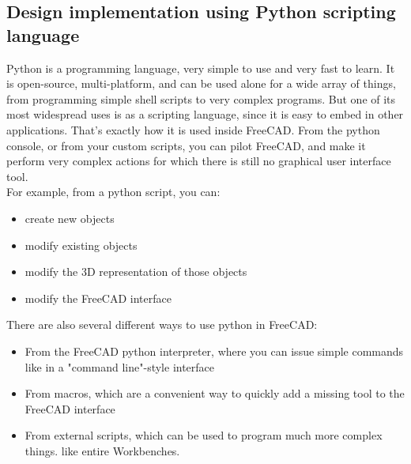 \subsection{Design implementation using Python scripting language}
Python is a programming language, very simple to use and very fast to learn. 
It is open-source, multi-platform, and can be used alone for a wide array of 
things, from programming simple shell scripts to very complex programs. But 
one of its most widespread uses is as a scripting language, since it is easy 
to embed in other applications. That's exactly how it is used inside FreeCAD. 
From the python console, or from your custom scripts, you can pilot FreeCAD, 
and make it perform very complex actions for which there is still no graphical 
user interface tool.\\
For example, from a python script, you can:
\begin{itemize}
\item create new objects
\item modify existing objects
\item modify the 3D representation of those objects
\item modify the FreeCAD interface
\end{itemize}
There are also several different ways to use python in FreeCAD:
\begin{itemize}
\item From the FreeCAD python interpreter, where you can issue simple commands like in a "command line"-style interface
\item From macros, which are a convenient way to quickly add a missing tool to the FreeCAD interface
\item From external scripts, which can be used to program much more complex things. like entire Workbenches.
\end{itemize}
